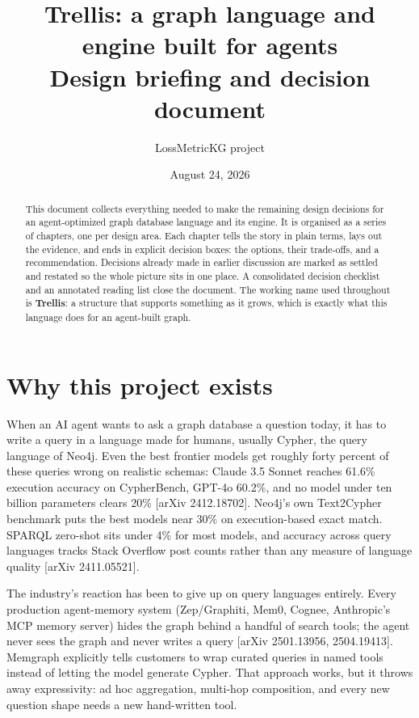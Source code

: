 \documentclass[11pt]{article}
\title{\textbf{Trellis: a graph language and engine built for agents}\\[6pt]
\large Design briefing and decision document}
\author{LossMetricKG project}
\date{August 24, 2026}
\begin{document}
\maketitle

\begin{abstract}
\noindent This document collects everything needed to make the remaining design decisions for an agent-optimized graph database language and its engine. It is organised as a series of chapters, one per design area. Each chapter tells the story in plain terms, lays out the evidence, and ends in explicit decision boxes: the options, their trade-offs, and a recommendation. Decisions already made in earlier discussion are marked as settled and restated so the whole picture sits in one place. A consolidated decision checklist and an annotated reading list close the document. The working name used throughout is \textbf{Trellis}: a structure that supports something as it grows, which is exactly what this language does for an agent-built graph.
\end{abstract}

\tableofcontents
\newpage

\section{Why this project exists}

When an AI agent wants to ask a graph database a question today, it has to write a query in a language made for humans, usually Cypher, the query language of Neo4j. Even the best frontier models get roughly forty percent of these queries wrong on realistic schemas: Claude 3.5 Sonnet reaches 61.6\% execution accuracy on CypherBench, GPT-4o 60.2\%, and no model under ten billion parameters clears 20\% [arXiv 2412.18702]. Neo4j's own Text2Cypher benchmark puts the best models near 30\% on execution-based exact match. SPARQL zero-shot sits under 4\% for most models, and accuracy across query languages tracks Stack Overflow post counts rather than any measure of language quality [arXiv 2411.05521].

The industry's reaction has been to give up on query languages entirely. Every production agent-memory system (Zep/Graphiti, Mem0, Cognee, Anthropic's MCP memory server) hides the graph behind a handful of search tools; the agent never sees the graph and never writes a query [arXiv 2501.13956, 2504.19413]. Memgraph explicitly tells customers to wrap curated queries in named tools instead of letting the model generate Cypher. That approach works, but it throws away expressivity: ad hoc aggregation, multi-hop composition, and every new question shape needs a new hand-written tool.
\end{document}
